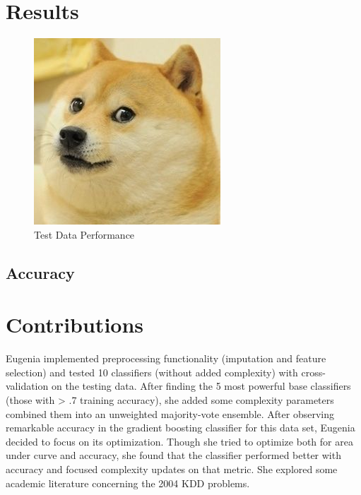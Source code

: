 \documentclass{article}
\begin{document}

\section{Results}
\label{results}

\begin{figure}[!h]
\centering
\includegraphics{placeholder}
\caption{Test Data Performance}
\label{fig:placeholder3}
\end{figure}

\subsection{Accuracy}


\section{Contributions}

Eugenia implemented preprocessing functionality (imputation and feature selection) and tested 10 classifiers (without added complexity) with cross-validation on the testing data. 
After finding the 5 most powerful base classifiers (those with > .7 training accuracy), she added some complexity parameters combined them into an unweighted majority-vote ensemble. 
After observing remarkable accuracy in the gradient boosting classifier for this data set, Eugenia decided to focus on its optimization.
Though she tried to optimize both for area under curve and accuracy, she found that the classifier performed better with accuracy and focused complexity updates on that metric.
She explored some academic literature concerning the 2004 KDD problems.
\end{document}
